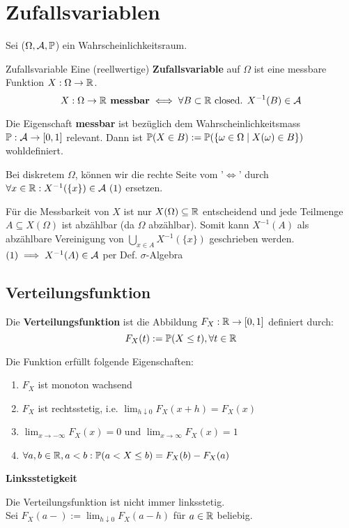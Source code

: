 \section{Zufallsvariablen}
Sei ($\Omega, \A, \P$) ein Wahrscheinlichkeitsraum.
\begin{mainbox}{Zufallsvariable}
    Eine (reellwertige) \textbf{Zufallsvariable} auf $\Omega$ ist eine messbare Funktion $X: \Omega \to \R$.
    $$X: \Omega \to \R \textbf{ messbar} \iff \forall B \subset \R \text { closed. } X^{-1}(B) \in \A$$
 
    Die Eigenschaft \textbf{messbar} ist bezüglich dem Wahrscheinlichkeitsmass $\P: \A \to [0,1]$ relevant. Dann ist $\P(X \in B) := \P(\{\omega \in \Omega \mid X(\omega) \in B\})$ wohldefiniert.
\end{mainbox}
Bei diskretem $\Omega$, können wir die rechte Seite vom '$\iff$' durch $\forall x \in \R: X^{-1}(\{x\})\in \A \ (1)$ ersetzen. 

Für die Messbarkeit von $X$ ist nur $X(\Omega) \subseteq \R$ entscheidend und jede Teilmenge $A \subseteq X(\Omega)$ ist abzählbar (da $\Omega$ abzählbar). Somit kann $X^{-1}(A)$ als abzählbare Vereinigung von $\bigcup_{x \in A} X^{-1}(\{x\})$ geschrieben werden. 
\\$(1) \implies X^{-1}(A) \in \A$ per Def. $\sigma$-Algebra
\subsection{Verteilungsfunktion}
Die \textbf{Verteilungsfunktion} ist die Abbildung $F_X : \R \to [0,1]$ definiert durch:
$$F_X(t) := \P(X \leq t), \forall t \in \R$$

Die Funktion erfüllt folgende Eigenschaften:
\begin{enumerate}
    \item $F_X$ ist monoton wachsend 
    \item $F_X$ ist rechtsstetig, i.e. $\lim_{h \downarrow 0}F_X(x+h) = F_X(x)$
    \item $\lim_{x \to -\infty}F_X(x) = 0$ und $\lim_{x \to \infty}F_X(x) = 1$
    \item $\forall a,b \in \R, a < b: \P(a < X \leq b) = F_X(b) -F_X(a)$ 
\end{enumerate}

\textbf{Linksstetigkeit}

Die Verteilungsfunktion ist nicht immer linksstetig.
\\Sei $F_X(a-) := \lim_{h \downarrow 0}F_X(a-h)$ für $a \in \R$ beliebig.

